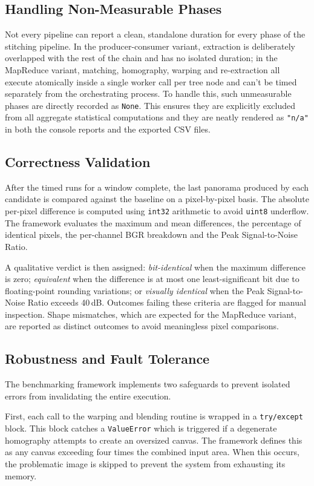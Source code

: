 \documentclass[10pt,twocolumn,letterpaper]{article}
\begin{document}
\subsection{Handling Non-Measurable Phases}
Not every pipeline can report a clean, standalone duration for every phase of the stitching
pipeline. In the producer-consumer variant, extraction is deliberately
overlapped with the rest of the chain and has no isolated duration; in the MapReduce variant,
matching, homography, warping and re-extraction all execute atomically inside a single
worker call per tree node and can't be timed separately from the orchestrating process. 
To handle this, such unmeasurable phases are directly recorded as \texttt{None}. 
This ensures they are explicitly excluded from all aggregate statistical 
computations and they are neatly rendered as \texttt{"n/a"} in both the 
console reports and the exported CSV files.

\subsection{Correctness Validation}
After the timed runs for a window complete, the last panorama produced by 
each candidate is compared against the baseline on a pixel-by-pixel basis. 
The absolute per-pixel difference is computed using \texttt{int32} arithmetic 
to avoid \texttt{uint8} underflow. The framework evaluates the maximum and 
mean differences, the percentage of identical pixels, the per-channel BGR 
breakdown and the Peak Signal-to-Noise Ratio. 

A qualitative verdict is then assigned: \emph{bit-identical} when the 
maximum difference is zero; \emph{equivalent} when the difference is at most 
one least-significant bit due to floating-point rounding variations; or 
\emph{visually identical} when the Peak Signal-to-Noise Ratio exceeds 40\,dB. 
Outcomes failing these criteria are flagged for manual inspection. Shape 
mismatches, which are expected for the MapReduce variant, are reported as 
distinct outcomes to avoid meaningless pixel comparisons.

\subsection{Robustness and Fault Tolerance}
\label{subsec:fault_tolerance}
The benchmarking framework implements two safeguards to prevent isolated errors from invalidating the entire execution. 

First, each call to the warping and blending routine is wrapped in a \texttt{try/except} block. 
This block catches a \texttt{ValueError} which is triggered if a degenerate homography attempts to create an oversized canvas. 
The framework defines this as any canvas exceeding four times the combined input area. 
When this occurs, the problematic image is skipped to prevent the system from exhausting its memory. 
\end{document}
